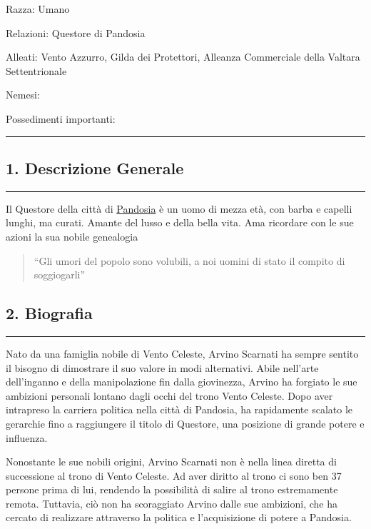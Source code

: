 Razza: Umano

Relazioni: Questore di Pandosia

Alleati: Vento Azzurro, Gilda dei Protettori, Alleanza Commerciale della
Valtara Settentrionale

Nemesi:

Possedimenti importanti:

\begin{center}\rule{0.5\linewidth}{0.5pt}\end{center}

\subsection{1. Descrizione Generale}\label{descrizione-generale}

\begin{center}\rule{0.5\linewidth}{0.5pt}\end{center}

Il Questore della città di
\href{Pandosia\%2028129d9d5ac7448d98387dc4262c4704.md}{Pandosia} è un
uomo di mezza età, con barba e capelli lunghi, ma curati. Amante del
lusso e della bella vita. Ama ricordare con le sue azioni la sua nobile
genealogia

\begin{quote}
``Gli umori del popolo sono volubili, a noi uomini di stato il compito
di soggiogarli''
\end{quote}

\subsection{2. Biografia}\label{biografia}

\begin{center}\rule{0.5\linewidth}{0.5pt}\end{center}

Nato da una famiglia nobile di Vento Celeste, Arvino Scarnati ha sempre
sentito il bisogno di dimostrare il suo valore in modi alternativi.
Abile nell'arte dell'inganno e della manipolazione fin dalla giovinezza,
Arvino ha forgiato le sue ambizioni personali lontano dagli occhi del
trono Vento Celeste. Dopo aver intrapreso la carriera politica nella
città di Pandosia, ha rapidamente scalato le gerarchie fino a
raggiungere il titolo di Questore, una posizione di grande potere e
influenza.

Nonostante le sue nobili origini, Arvino Scarnati non è nella linea
diretta di successione al trono di Vento Celeste. Ad aver diritto al
trono ci sono ben 37 persone prima di lui, rendendo la possibilità di
salire al trono estremamente remota. Tuttavia, ciò non ha scoraggiato
Arvino dalle sue ambizioni, che ha cercato di realizzare attraverso la
politica e l'acquisizione di potere a Pandosia.

